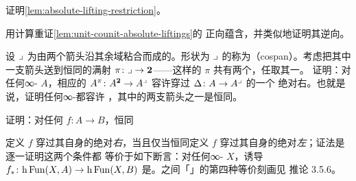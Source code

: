 \begin{exercise}\label{ex:restriction-absolute-lifting}
证明\cref{lem:absolute-lifting-restriction}。
\end{exercise}

\begin{exercise}\label{ex:pasting-reproves-unit-counit}
用\trPastingDiagram{}计算重证\cref{lem:unit-counit-absolute-liftings}的%
正向蕴含，并类似地证明其逆向。
\end{exercise}

\begin{exercise}\label{ex:cospan-pullbacks}
设 $\lrcorner$ 为由两个箭头沿其余域粘合而成的\trCategory{}。形状为%
$\lrcorner$ 的\trDiagram{}称为\textbf{\trCospan}（cospan）。考虑把其中%
一支箭头送到恒同的满射\trFunctor{}
$\pi\colon\lrcorner\to\mathbf{2}$——这样的 $\pi$ 共有两个，任取其一。
证明：对任何∞-\trCategory{} $A$，相应的\trFunctor{}
$A^{\pi}\colon A^{\mathbf{2}}\to A^{\lrcorner}$ 容许穿过%
\trConstantFunctor{} $\Delta\colon A\to A^{\lrcorner}$ 的一个%
绝对右\trLifting{}。也就是说，证明任何∞-\trCategory{}都容许%
\trPullback{}，其中\trCospan{}的两支箭头之一是恒同。
\end{exercise}

\begin{exercise}[3.5.6]\label{ex:fully-faithful-liftings}
证明：对任何\trFunctor{} $f\colon A\to B$，恒同
\begin{center}
\end{center}
定义 $f$ 穿过其自身的绝对\emph{右}\trLifting{}，当且仅当恒同定义 $f$
穿过其自身的绝对\emph{左}\trLifting{}；证法是逐一证明这两个条件都%
等价于如下断言：对任何∞-\trCategory{} $X$，诱导\trFunctor{}
$f_{\ast}\colon\mathrm{h}\operatorname{Fun}(X,A)\to\mathrm{h}\operatorname{Fun}(X,B)$
是\trFullyFaithful。\trFunctor{}之间「\trFullyFaithful」的第四种等价刻画见%
推论 3.5.6。
\end{exercise}

